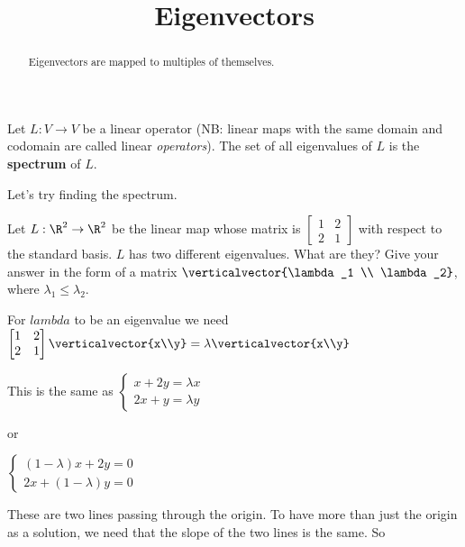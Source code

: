 \documentclass{ximera}
\title{Eigenvectors}
\begin{document}
\begin{abstract}
  Eigenvectors are mapped to multiples of themselves.
\end{abstract}

\begin{definition}
  Let $L : V \to V$ be a linear operator (NB: linear maps with the
  same domain and codomain are called linear \textit{operators}).  The
  set of all eigenvalues of $L$ is the \textbf{spectrum} of $L$.
\end{definition}

Let's try finding the spectrum.

\begin{question}
  Let $L :\R^2 \to \R^2$ be the linear map whose matrix is
  \(\begin{bmatrix} 1 & 2 \\2& 1\end{bmatrix}\) with respect to the
  standard basis.  $L$ has two different eigenvalues.  What are they?
  Give your answer in the form of a matrix $\verticalvector{\lambda_1 \\
    \lambda_2}$, where $\lambda_1 \leq \lambda_2$.
	
  \begin{solution}
    \begin{hint}
      For $lambda$ to be an eigenvalue we need
      \(\begin{bmatrix} 1 & 2 \\2& 1\end{bmatrix} \verticalvector{x\\y} = \lambda \verticalvector{x\\y}\)
    \end{hint}
    \begin{hint}
      This is the same as \(\begin{cases}
        x+2y = \lambda x \\
        2x+y =\lambda y
      \end{cases}\)
      
      or
      
      \(\begin{cases}
        (1-\lambda)x+2y = 0 \\
        2x+(1-\lambda)y =0
      \end{cases}\)
      
    \end{hint}
    \begin{hint}
      These are two lines passing through the origin.  To have more than just the origin as a solution, we need that the slope of the two lines is the same.  So
      

\end{hint}
\end{solution}
\end{question}
\end{document}
